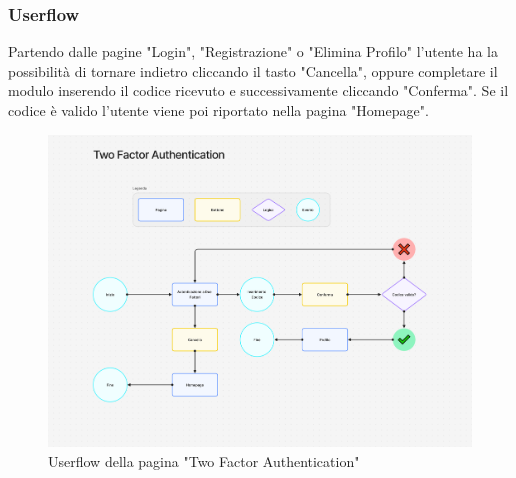 \documentclass{report}
\begin{document}
\subsubsection*{Userflow}
Partendo dalle pagine "Login", "Registrazione" o "Elimina Profilo" l'utente ha la possibilità di tornare indietro cliccando il tasto "Cancella", oppure completare il modulo inserendo il codice ricevuto e successivamente cliccando "Conferma". Se il codice è valido l'utente viene poi riportato nella pagina "Homepage".
\begin{figure}[H]
	\centering\includegraphics[width=1\textwidth]{images/microservizio-autenticazione/frontend/twofa-userflow.png}
	Userflow della pagina "Two Factor Authentication"
\end{figure}
\end{document}

